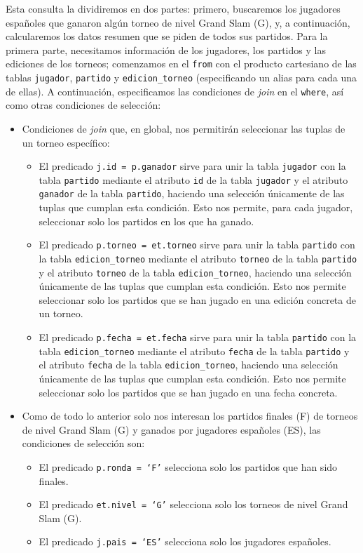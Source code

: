 Esta consulta la dividiremos en dos partes: primero, buscaremos los jugadores españoles que ganaron algún torneo de nivel Grand Slam (G), y, a continuación, calcularemos los datos resumen que se piden de todos sus partidos. Para la primera parte, necesitamos información de los jugadores, los partidos y las ediciones de los torneos; comenzamos en el \texttt{from} con el producto cartesiano de las tablas \texttt{jugador}, \texttt{partido} y \texttt{edicion\_torneo} (especificando un alias para cada una de ellas). A continuación, especificamos las condiciones de \textit{join} en el \texttt{where}, así como otras condiciones de selección:
\begin{itemize}
\item Condiciones de \textit{join} que, en global, nos permitirán seleccionar las tuplas de un torneo específico:
\begin{itemize}
\item El predicado \texttt{j.id = p.ganador} sirve para unir la tabla \texttt{jugador} con la tabla \texttt{partido} mediante el atributo \texttt{id} de la tabla \texttt{jugador} y el atributo \texttt{ganador} de la tabla \texttt{partido}, haciendo una selección únicamente de las tuplas que cumplan esta condición. Esto nos permite, para cada jugador, seleccionar solo los partidos en los que ha ganado. 
\item El predicado \texttt{p.torneo = et.torneo} sirve para unir la tabla \texttt{partido} con la tabla \texttt{edicion\_torneo} mediante el atributo \texttt{torneo} de la tabla \texttt{partido} y el atributo \texttt{torneo} de la tabla \texttt{edicion\_torneo}, haciendo una selección únicamente de las tuplas que cumplan esta condición. Esto nos permite seleccionar solo los partidos que se han jugado en una edición concreta de un torneo.
\item El predicado \texttt{p.fecha = et.fecha} sirve para unir la tabla \texttt{partido} con la tabla \texttt{edicion\_torneo} mediante el atributo \texttt{fecha} de la tabla \texttt{partido} y el atributo \texttt{fecha} de la tabla \texttt{edicion\_torneo}, haciendo una selección únicamente de las tuplas que cumplan esta condición. Esto nos permite seleccionar solo los partidos que se han jugado en una fecha concreta.
\end{itemize}
\item Como de todo lo anterior solo nos interesan los partidos finales (F) de torneos de nivel Grand Slam (G) y ganados por jugadores españoles (ES), las condiciones de selección son:
\begin{itemize}
\item El predicado \texttt{p.ronda = `F'} selecciona solo los partidos que han sido finales.
\item El predicado \texttt{et.nivel = `G'} selecciona solo los torneos de nivel Grand Slam (G).
\item El predicado \texttt{j.pais = `ES'} selecciona solo los jugadores españoles.
\end{itemize}
\end{itemize}


